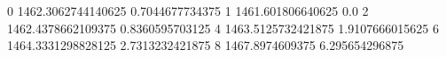 0 1462.3062744140625 0.7044677734375
1 1461.601806640625 0.0
2 1462.4378662109375 0.8360595703125
4 1463.5125732421875 1.9107666015625
6 1464.3331298828125 2.7313232421875
8 1467.8974609375 6.295654296875
